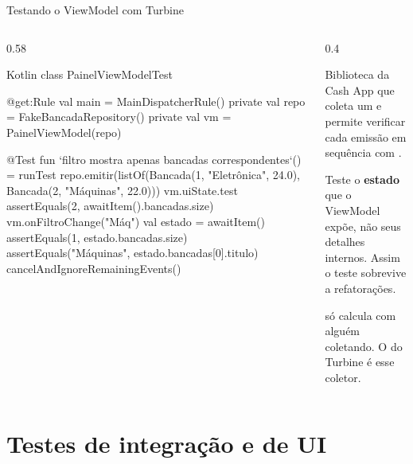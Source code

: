\documentclass[aspectratio=169,10pt]{beamer}
\begin{document}
\begin{frame}[fragile]{Testando o ViewModel com Turbine}
  \begin{columns}[T]
    \begin{column}{0.58\textwidth}
\begin{codigo}[title=PainelViewModelTest.kt]{Kotlin}
class PainelViewModelTest {
  @get:Rule val main = MainDispatcherRule()
  private val repo = FakeBancadaRepository()
  private val vm = PainelViewModel(repo)

  @Test
  fun `filtro mostra apenas bancadas correspondentes`() =
    runTest {
      repo.emitir(listOf(Bancada(1, "Eletrônica", 24.0),
                         Bancada(2, "Máquinas", 22.0)))
      vm.uiState.test {
        assertEquals(2, awaitItem().bancadas.size)
        vm.onFiltroChange("Máq")
        val estado = awaitItem()
        assertEquals(1, estado.bancadas.size)
        assertEquals("Máquinas", estado.bancadas[0].titulo)
        cancelAndIgnoreRemainingEvents()
      }
    }
}
\end{codigo}
    \end{column}
    \begin{column}{0.4\textwidth}
      \begin{conceito}[Turbine]
        Biblioteca da Cash App que coleta um  e permite verificar cada emissão em sequência com .
      \end{conceito}
      \begin{dica}
        Teste o \textbf{estado} que o ViewModel expõe, não seus detalhes internos. Assim o teste sobrevive a refatorações.
      \end{dica}
      \begin{atencao}
         só calcula com alguém coletando. O  do Turbine é esse coletor.
      \end{atencao}
    \end{column}
  \end{columns}
\end{frame}

\section{Testes de integração e de UI}
\end{document}
